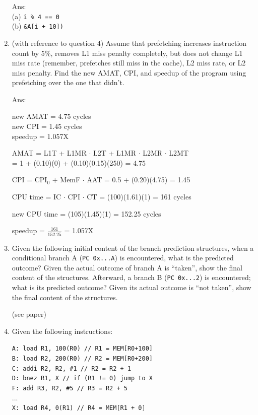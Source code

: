 \documentclass[12pt]{article}
\begin{document}
\begin{enumerate}
        Ans: \\
        (a) \texttt{i \% 4 == 0}\\
        (b) \texttt{\&A[i + 10])}

        \item (with reference to question 4) Assume that prefetching increases instruction count by 5\%, removes L1 
        miss penalty completely, but does not change L1 miss rate (remember, prefetches still miss in the cache), L2 
        miss rate, or L2 miss penalty. Find the new AMAT, CPI, and speedup of the program using prefetching over the 
        one that didn't.

        Ans:

        new AMAT = 4.75 cycles\\
        new CPI = 1.45 cycles\\
        speedup = 1.057X

        AMAT = L1T + L1MR $\cdot$ L2T + L1MR $\cdot$ L2MR $\cdot$ L2MT\\
        = 1 + (0.10)(0) + (0.10)(0.15)(250) = 4.75

        CPI = CPI$_0$ + MemF $\cdot$ AAT = 0.5 + (0.20)(4.75) = 1.45

        CPU time = IC $\cdot$ CPI $\cdot$ CT = (100)(1.61)(1) = 161 cycles

        new CPU time = (105)(1.45)(1) = 152.25 cycles

        speedup = $\frac{161}{152.25}$ = 1.057X

        \item Given the following initial content of the branch prediction structures, when a conditional branch A 
        (\texttt{PC 0x...A}) is encountered, what is the predicted outcome? Given the actual outcome of branch A is ``taken'', 
        show the final content of the structures. Afterward, a branch B (\texttt{PC 0x...2}) is encountered; what is 
        its predicted outcome? Given its actual outcome is ``not taken'', show the final content of the structures.

        (see paper)

        \item Given the following instructions:
        
        \texttt{A: load R1, 100(R0) // R1 = MEM[R0+100]}\\
        \texttt{B: load R2, 200(R0) // R2 = MEM[R0+200]}\\
        \texttt{C: addi R2, R2, \#1 // R2 = R2 + 1}\\
        \texttt{D: bnez R1, X // if (R1 != 0) jump to X}\\
        \texttt{F: add R3, R2, \#5  // R3 = R2 + 5}\\
        ...\\
        \texttt{X: load R4, 0(R1) // R4 = MEM[R1 + 0]}


\end{enumerate}
\end{document}
